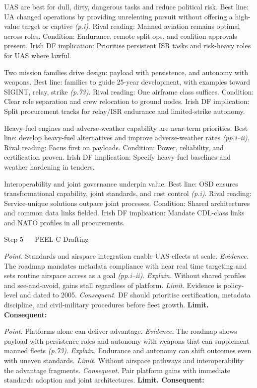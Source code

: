 UAS are best for dull, dirty, dangerous tasks and reduce political risk.
Best line: UA changed operations by providing unrelenting pursuit without offering a high-value target or captive \emph{(p.i)}.
Rival reading: Manned aviation remains optimal across roles.
Condition: Endurance, remote split ops, and coalition approvals present.
Irish DF implication: Prioritise persistent ISR tasks and risk-heavy roles for UAS where lawful.

Two mission families drive design: payload with persistence, and autonomy with weapons.
Best line: families to guide 25-year development, with examples toward SIGINT, relay, strike \emph{(p.73)}.
Rival reading: One airframe class suffices.
Condition: Clear role separation and crew relocation to ground nodes.
Irish DF implication: Split procurement tracks for relay/ISR endurance and limited-strike autonomy.

Heavy-fuel engines and adverse-weather capability are near-term priorities.
Best line: develop heavy-fuel alternatives and improve adverse-weather rates \emph{(pp.i–ii)}.
Rival reading: Focus first on payloads.
Condition: Power, reliability, and certification proven.
Irish DF implication: Specify heavy-fuel baselines and weather hardening in tenders.

Interoperability and joint governance underpin value.
Best line: OSD ensures transformational capability, joint standards, and cost control \emph{(p.i)}.
Rival reading: Service-unique solutions outpace joint processes.
Condition: Shared architectures and common data links fielded.
Irish DF implication: Mandate CDL-class links and NATO profiles in all procurements.

Step 5 — PEEL-C Drafting

\textit{Point.} Standards and airspace integration enable UAS effects at scale.
\textit{Evidence.} The roadmap mandates metadata compliance with near real time targeting and sets routine airspace access as a goal \emph{(pp.i–ii)}.
\textit{Explain.} Without shared profiles and see-and-avoid, gains stall regardless of platform.
\textit{Limit.} Evidence is policy-level and dated to 2005.
\textit{Consequent.} DF should prioritise certification, metadata discipline, and civil-military procedures before fleet growth. \textbf{Limit. Consequent:}

\textit{Point.} Platforms alone can deliver advantage.
\textit{Evidence.} The roadmap shows payload-with-persistence roles and autonomy with weapons that can supplement manned fleets \emph{(p.73)}.
\textit{Explain.} Endurance and autonomy can shift outcomes even with uneven standards.
\textit{Limit.} Without airspace pathways and interoperability the advantage fragments.
\textit{Consequent.} Pair platform gains with immediate standards adoption and joint architectures. \textbf{Limit. Consequent:}

